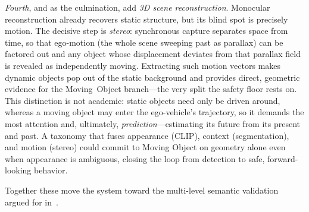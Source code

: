 \documentclass[conference]{IEEEtran}
\begin{document}
\emph{Fourth}, and as the culmination, add \emph{3D scene reconstruction}.
Monocular reconstruction already recovers static structure, but its blind spot is
precisely motion. The decisive step is \emph{stereo}: synchronous capture
separates space from time, so that ego-motion (the whole scene sweeping past as
parallax) can be factored out and any object whose displacement deviates from that
parallax field is revealed as independently moving. Extracting such motion vectors
makes dynamic objects pop out of the static background and provides direct,
geometric evidence for the \textsf{Moving~Object} branch---the very split the
safety floor rests on. This distinction is not academic: static objects need only
be driven around, whereas a moving object may enter the ego-vehicle's trajectory,
so it demands the most attention and, ultimately, \emph{prediction}---estimating
its future from its present and past. A taxonomy that fuses appearance (CLIP),
context (segmentation), and motion (stereo) could commit to \textsf{Moving
Object} on geometry alone even when appearance is ambiguous, closing the loop from
detection to safe, forward-looking behavior.

Together these move the system toward the multi-level semantic validation argued
for in~\cite{schaller2025}.



\end{document}
